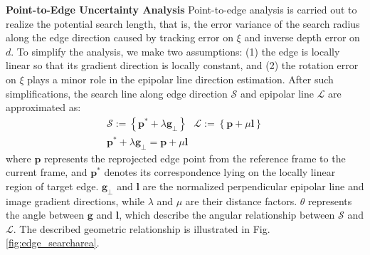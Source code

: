 \noindent \textbf{Point-to-Edge Uncertainty Analysis}
Point-to-edge analysis is carried out to realize the potential search length, that is, the error variance of the search radius along the edge direction caused by tracking error on $\xi$ and inverse depth error on $d$. 
To simplify the analysis, we make two assumptions: 
(1) the edge is locally linear so that its gradient direction is locally constant, and 
(2) the rotation error on $\xi$ plays a minor role in the epipolar line direction estimation. 
After such simplifications, the search line along edge direction $\mathcal{S}$ and epipolar line $\mathcal{L}$ are approximated as:  
\begin{subequations}
\begin{gather} 
\mathcal{S} := \left \{ \mathbf{p}^* +  \lambda \mathbf{g}_{\perp} \right \} \ \ \ 
\mathcal{L} := \left \{ \mathbf{p} +  \mu \mathbf{l} \right \} \label{eq:edge_searchradius} \\
 \mathbf{p}^* +  \lambda \mathbf{g}_{\perp} = \mathbf{p} +  \mu \mathbf{l} \label{eq:edge_intersection}
\end{gather}
\end{subequations}
where $\mathbf{p}$ represents the reprojected edge point from the reference frame to the current frame, and $\mathbf{p}^{*}$ denotes its correspondence lying on the locally linear region of target edge. $\mathbf{g}_{\perp}$ and $\mathbf{l}$ are the normalized perpendicular epipolar line and image gradient directions, while $\lambda$ and $\mu$ are their distance factors. $\theta$ represents the angle between $\mathbf{g}$ and $\mathbf{l}$, which describe the angular relationship between $\mathcal{S}$ and $\mathcal{L}$. The described geometric relationship is illustrated in Fig. \ref{fig:edge_searcharea}. 

